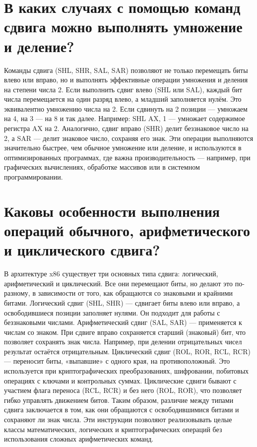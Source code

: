 \section{В каких случаях с помощью команд сдвига можно выполнять умножение и деление?}

Команды сдвига (SHL, SHR, SAL, SAR) позволяют не только перемещать биты влево или вправо, но и выполнять эффективные операции умножения и деления на степени числа 2.
Если выполнить сдвиг влево (SHL или SAL), каждый бит числа перемещается на один разряд влево, а младший заполняется нулём. Это эквивалентно умножению числа на 2. Если сдвинуть на 2 позиции — умножаем на 4, на 3 — на 8 и так далее. Например:
SHL AX, 1 — умножает содержимое регистра AX на 2.
Аналогично, сдвиг вправо (SHR) делит беззнаковое число на 2, а SAR — делит знаковое число, сохраняя его знак.
Эти операции выполняются значительно быстрее, чем обычное умножение или деление, и используются в оптимизированных программах, где важна производительность — например, при графических вычислениях, обработке массивов или в системном программировании.

\section{Каковы особенности выполнения операций обычного, арифметического и циклического сдвига?}

В архитектуре x86 существует три основных типа сдвига: логический, арифметический и циклический. Все они перемещают биты, но делают это по-разному, в зависимости от того, как обращаются со знаковыми и крайними битами.
Логический сдвиг (SHL, SHR) — сдвигает биты влево или вправо, а освободившиеся позиции заполняет нулями. Он подходит для работы с беззнаковыми числами.
Арифметический сдвиг (SAL, SAR) — применяется к числам со знаком. При сдвиге вправо сохраняется старший (знаковый) бит, что позволяет сохранять знак числа. Например, при делении отрицательных чисел результат остаётся отрицательным.
Циклический сдвиг (ROL, ROR, RCL, RCR) — переносит биты, «выпавшие» с одного края, на противоположный. Это используется при криптографических преобразованиях, шифровании, побитовых операциях с ключами и контрольных суммах.
Циклические сдвиги бывают с участием флага переноса (RCL, RCR) и без него (ROL, ROR), что позволяет гибко управлять движением битов.
Таким образом, различие между типами сдвига заключается в том, как они обращаются с освободившимися битами и сохраняют ли знак числа. Эти инструкции позволяют реализовывать целые классы математических, логических и криптографических операций без использования сложных арифметических команд.

\endinput

